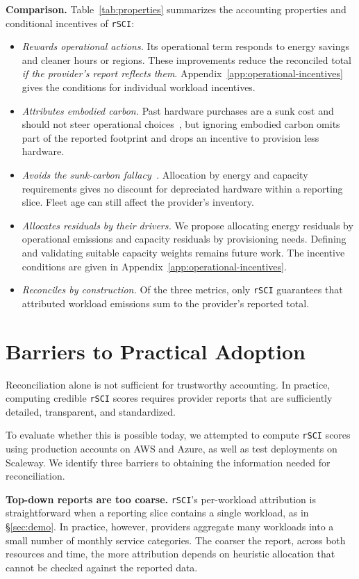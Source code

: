 \documentclass[sigconf,screen,nonacm]{acmart}
\newcommand{\parag}[1]{\vspace{2mm}\noindent\textbf{#1.}\hspace{2mm}}
\newcommand{\RSCI}{\texttt{rSCI}\xspace}
\begin{document}
\parag{Comparison}
Table~\ref{tab:properties} summarizes the accounting properties and conditional incentives of \RSCI:
\begin{itemize}
\setlength{\itemsep}{2pt}
  \item \emph{Rewards operational actions.} Its operational term responds to energy savings and cleaner hours or regions.
  These improvements reduce the reconciled total \emph{if the provider's report reflects them}.
  Appendix~\ref{app:operational-incentives} gives the conditions for individual workload incentives.
  \item \emph{Attributes embodied carbon.} Past hardware purchases are a sunk cost and should not steer operational choices~\cite{bashir2024}, but ignoring embodied carbon omits part of the reported footprint and drops an incentive to provision less hardware.
  \item \emph{Avoids the sunk-carbon fallacy~\cite{bashir2024}.} Allocation by energy and capacity requirements gives no discount for depreciated hardware within a reporting slice.
  Fleet age can still affect the provider's inventory.
  \item \emph{Allocates residuals by their drivers.} We propose allocating energy residuals by operational emissions and capacity residuals by provisioning needs.
  Defining and validating suitable capacity weights remains future work.
  The incentive conditions are given in Appendix~\ref{app:operational-incentives}.
  \item \emph{Reconciles by construction.} Of the three metrics, only \RSCI guarantees that attributed workload emissions sum to the provider's reported total.
\end{itemize}

\section{Barriers to Practical Adoption}
\label{sec:practice}

Reconciliation alone is not sufficient for trustworthy accounting.
In practice, computing credible \RSCI scores requires provider reports that are sufficiently detailed, transparent, and standardized.

To evaluate whether this is possible today, we attempted to compute \RSCI scores using production accounts on AWS and Azure, as well as test deployments on Scaleway.
We identify three barriers to obtaining the information needed for reconciliation.

\parag{Top-down reports are too coarse}
\RSCI's per-workload attribution is straightforward when a reporting slice contains a single workload, as in \S\ref{sec:demo}.
In practice, however, providers aggregate many workloads into a small number of monthly service categories.
The coarser the report, across both resources and time, the more attribution depends on heuristic allocation that cannot be checked against the reported data.
\end{document}
